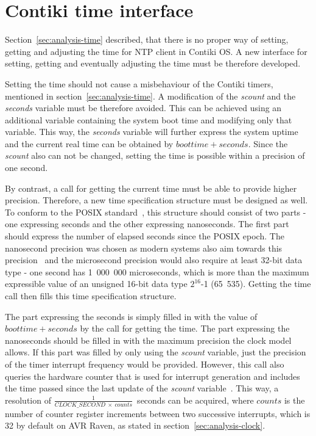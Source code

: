 
\section{Contiki time interface}\label{sec:analysis-interface}
Section~\ref{sec:analysis-time} described, that there is no proper
way of setting, getting and adjusting the time for NTP client in Contiki OS.
A new interface for setting, getting and eventually adjusting the time
must be therefore developed.

Setting the time should not cause a misbehaviour of the Contiki timers,
mentioned in section~\ref{sec:analysis-time}.
A modification of the {\it{scount}} and the {\it{seconds}} variable must be therefore avoided.
This can be achieved using an additional variable containing the system boot time
and modifying only that variable.
This way, the {\it{seconds}} variable will further express the system uptime
and the current real time can be obtained by $boottime + seconds$.
Since the {\it{scount}} also can not be changed, setting the time is possible
within a precision of one second.

By contrast, a call for getting the current time must be able to provide higher precision.
Therefore, a new time specification structure must be designed as well.
To conform to the POSIX standard~\cite{posix}, this structure should consist of two parts -
one expressing seconds and the other expressing nanoseconds.
The first part should express the number of elapsed seconds since the POSIX epoch.
The nanosecond precision was chosen as modern systems also aim towards this
precision~\cite{posix,ntp-precision} and
the microsecond precision would also require at least 32-bit data type -
one second has 1~000~000 microseconds, which is more than the maximum expressible value of
an unsigned 16-bit data type $2^{16}$-1 (65~535).
Getting the time call then fills this time specification structure.

The part expressing the seconds is simply filled in with the value of $boottime + seconds$
by the call for getting the time.
The part expressing the nanoseconds should be filled in with the maximum precision
the clock model allows.
If this part was filled by only using the {\it{scount}} variable,
just the precision of the timer interrupt frequency would be provided.
However, this call also queries the hardware counter that is used for
interrupt generation and includes the time passed since
the last update of the {\it{scount}} variable~\cite{thesis-beat}.
This way, a resolution of $\frac{1}{CLOCK\_SECOND~\times~counts}$~seconds can be acquired,
where $counts$ is the number of counter register increments between two successive interrupts,
which is 32 by default on AVR Raven, as stated in section~\ref{sec:analysis-clock}.

